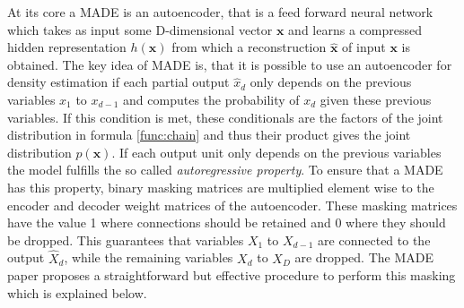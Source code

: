 \documentclass[11pt,titlepage,oneside,openany]{book}
\begin{document}
At its core a MADE is an autoencoder, that is a feed forward neural network which takes as input some D-dimensional vector $\pmb{x}$ and learns a compressed hidden representation $h(\pmb{x})$ from which a reconstruction $\hat{\pmb{x}}$ of input $\pmb{x}$ is obtained. The key idea of MADE is, that it is possible to use an autoencoder for density estimation if each partial output $\hat{x}_d$ only depends on the previous variables $x_1$ to $x_{d-1}$ and computes the probability of $x_d$ given these previous variables. If this condition is met, these conditionals are the factors of the joint distribution in formula \ref{func:chain} and thus their product gives the joint distribution $p(\pmb{x})$. If each output unit only depends on the previous variables the model fulfills the so called \emph{autoregressive property}. To ensure that a MADE has this property, binary masking matrices are multiplied element wise to the encoder and decoder weight matrices of the autoencoder. These masking matrices have the value 1 where connections should be retained and 0 where they should be dropped. This guarantees that variables $X_1$ to $X_{d-1}$ are connected to the output $\hat{X}_d$, while the remaining variables $X_d$ to $X_D$ are dropped. The MADE paper \cite{germain_made_nodate} proposes a straightforward but effective procedure to perform this masking which is explained below.
\end{document}
